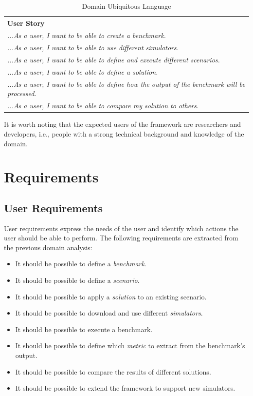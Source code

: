 \documentclass[12pt,a4paper,openright,twoside]{book}
\begin{document}
\begin{table}[H]
  \centering
  \begin{tabular}{|p{}|}
    \toprule
    \textbf{User Story}                                                                                   \\
    \midrule
    \textit{...As a user, I want to be able to create a benchmark.}                                       \\ \hline
    \textit{...As a user, I want to be able to use different simulators.}                                 \\ \hline
    \textit{...As a user, I want to be able to define and execute different scenarios.}                   \\ \hline
    \textit{...As a user, I want to be able to define a solution.}                                        \\ \hline
    \textit{...As a user, I want to be able to define how the output of the benchmark will be processed.} \\ \hline
    \textit{...As a user, I want to be able to compare my solution to others.}                       \\ \hline
  \end{tabular}
  \caption{Domain Ubiquitous Language}
\end{table}

It is worth noting that the expected users of the framework are researchers and developers, i.e., people with a strong technical background and knowledge of the domain.

\section{Requirements}

\subsection{User Requirements}
User requirements express the needs of the user and identify which actions the user should be able to perform.
The following requirements are extracted from the previous domain analysis:
\begin{itemize}
  \item It should be possible to define a \emph{benchmark}.
  \item It should be possible to define a \emph{scenario}.
  \item It should be possible to apply a \emph{solution} to an existing scenario.
  \item It should be possible to download and use different \emph{simulators}.
  \item It should be possible to execute a benchmark.
  \item It should be possible to define which \emph{metric} to extract from the benchmark's output.
  \item It should be possible to compare the results of different solutions.
  \item It should be possible to extend the framework to support new simulators.
\end{itemize}
\end{document}
